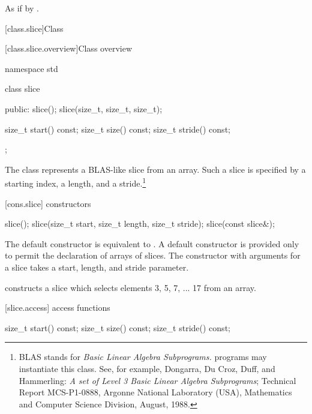 \begin{itemdescr}
\pnum
\effects As if by .
\end{itemdescr}


[class.slice]{Class }

[class.slice.overview]{Class  overview}

%
\begin{codeblock}
namespace std {
  class slice {
  public:
    slice();
    slice(size_t, size_t, size_t);

    size_t start() const;
    size_t size() const;
    size_t stride() const;
  };
}
\end{codeblock}

\pnum
The
class represents a BLAS-like slice from an array.
Such a slice is specified by a starting index, a length, and a
stride.\footnote{BLAS stands for
\textit{Basic Linear Algebra Subprograms.}
\Cpp programs may instantiate this class.
See, for example,
Dongarra, Du Croz, Duff, and Hammerling:
\textit{A set of Level 3 Basic Linear Algebra Subprograms};
Technical Report MCS-P1-0888,
Argonne National Laboratory (USA),
Mathematics and Computer Science Division,
August, 1988.}

[cons.slice]{ constructors}

%
\begin{itemdecl}
slice();
slice(size_t start, size_t length, size_t stride);
slice(const slice&);
\end{itemdecl}

\begin{itemdescr}
\pnum
The default constructor is equivalent to .
A default constructor is provided only to permit the declaration of arrays of slices.
The constructor with arguments for a slice takes a start, length, and stride
parameter.

\pnum
\begin{example}
constructs a slice which selects elements 3, 5, 7, ... 17 from an array.
\end{example}
\end{itemdescr}

[slice.access]{ access functions}
%
%
%
\begin{itemdecl}
size_t start() const;
size_t size() const;
size_t stride() const;
\end{itemdecl}

